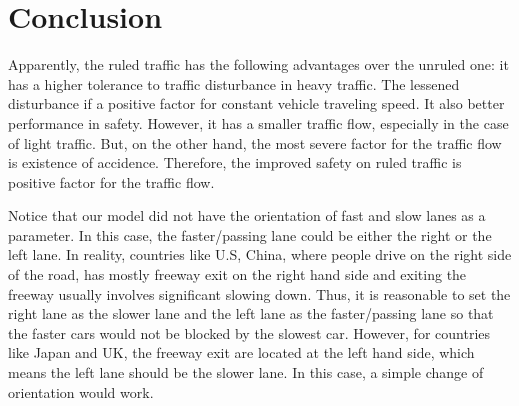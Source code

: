\documentclass[aps,prl,superscriptaddress,12pt]{revtex4-1}
\begin{document}
	\section{Conclusion}

	Apparently, the ruled traffic has the following advantages over the unruled one: it has a higher tolerance to traffic disturbance in heavy traffic. The lessened disturbance if a positive factor for constant vehicle traveling speed. It also better performance in safety. However, it has a smaller traffic flow, especially in the case of light traffic. But, on the other hand, the most severe factor for the traffic flow is existence of accidence. Therefore, the improved safety on ruled traffic is positive factor for the traffic flow. 

	Notice that our model did not have the orientation of fast and slow lanes as a parameter. In this case, the faster/passing lane could be either the right or the left lane. In reality, countries like U.S, China, where people drive on the right side of the road, has mostly freeway exit on the right hand side and exiting the freeway usually involves significant slowing down. Thus, it is reasonable to set the right lane as the slower lane and the left lane as the faster/passing lane so that the faster cars would not be blocked by the slowest car.  However, for countries like Japan and UK, the freeway exit are located at the left hand side, which means the left lane should be the slower lane. In this case, a simple change of orientation would work. 
	
	
	


\end{document}
